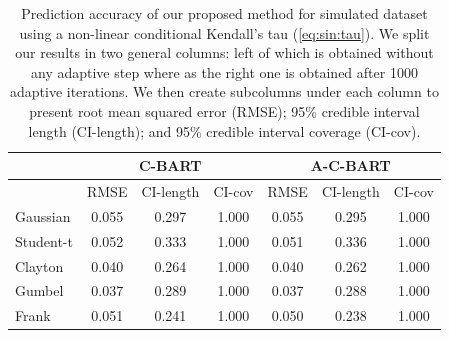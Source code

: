 \documentclass{amsart}
\begin{document}
\begin{table}[ht]
	\centering
	\begin{tabular}{l|ccc|ccc}
		\multicolumn{1}{c|}{} &
		\multicolumn{3}{c|}{C-BART} &
		\multicolumn{3}{c}{A-C-BART} \\
		\midrule
		& RMSE & CI-length & CI-cov & RMSE & CI-length & CI-cov \\ 
		\midrule
		Gaussian & 0.055 & 0.297 & 1.000 & 0.055 & 0.295 & 1.000 \\ 
		Student-t & 0.052 & 0.333 & 1.000 & 0.051 & 0.336 & 1.000 \\ 
		Clayton & 0.040 & 0.264 & 1.000 & 0.040 & 0.262 & 1.000 \\ 
		Gumbel & 0.037 & 0.289 & 1.000 & 0.037 & 0.288 & 1.000 \\ 
		Frank & 0.051 & 0.241 & 1.000 & 0.050 & 0.238 & 1.000 \\  
	\end{tabular}
	\caption{Prediction accuracy of our proposed method for simulated dataset using a non-linear conditional Kendall's tau (\cref{eq:sin:tau}). We split our results in two general columns: left of which is obtained without any adaptive step where as the right one is obtained after 1000 adaptive iterations. We then create subcolumns under each column to present root mean squared error (RMSE); 95\% credible interval length (CI-length); and 95\% credible interval coverage (CI-cov).}
	\label{tab:pred:ex2}
\end{table}

\end{document}
